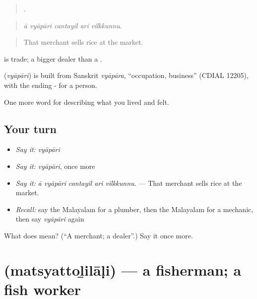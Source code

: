 \begin{quote}
    .
\end{quote}

\begin{quote}
\emph{ā vyāpāri cantayil ari vilkkunnu.}
\end{quote}

\begin{quote}
That merchant sells rice at the market.
\end{quote}

 is trade; a bigger dealer than a .

\begin{cousinweb}
\textbf{} (\emph{vyāpāri}) is built from Sanskrit \emph{vyāpāra}, \textquotedblleft{}occupation, business\textquotedblright{} (CDIAL 12205), with the ending - for a person.
\end{cousinweb}

\begin{grammarlens}[title={What you've built}]
One more word for describing what you lived and felt.
\end{grammarlens}

\subsection*{Your turn}
\begin{itemize}
\raggedright
  \item \emph{Say it:} \emph{vyāpāri}
  \item \emph{Say it:} \emph{vyāpāri}, once more
  \item \emph{Say it:} \emph{ā vyāpāri cantayil ari vilkkunnu.} — That merchant sells rice at the market.
  \item \emph{Recall:} say the Malayalam for a plumber, then the Malayalam for a mechanic, then say \emph{vyāpāri} again
\end{itemize}

\begin{tcolorbox}[breakable,colback=teal!4,colframe=teal!35!black,title={Before you move on}]
What does  mean? (\textquotedblleft{}A merchant; a dealer\textquotedblright{}.) Say it once more.
\end{tcolorbox}
\section[\texorpdfstring{\ml{മത്സ്യത്തൊഴിലാളി} (matsyattoḻilāḷi)}{മത്സ്യത്തൊഴിലാളി (matsyattoḻilāḷi)}]{ (matsyattoḻilāḷi) — a fisherman; a fish worker}


